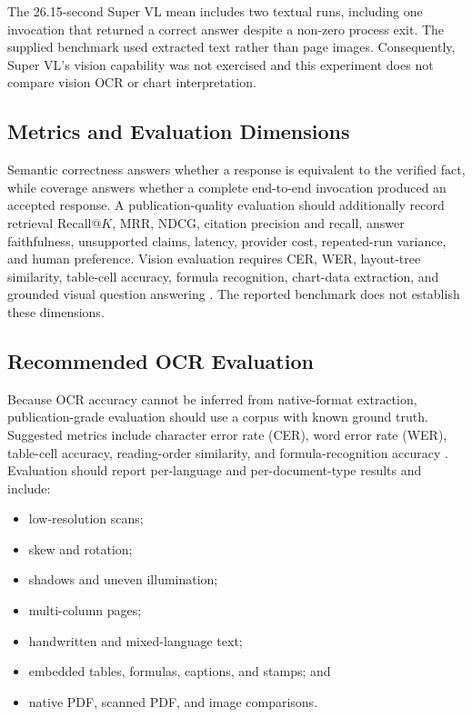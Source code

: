\documentclass[conference]{IEEEtran}
\begin{document}
The 26.15-second Super VL mean includes two textual runs, including one invocation that returned a correct answer despite a non-zero process exit. The supplied benchmark used extracted text rather than page images. Consequently, Super VL's vision capability was not exercised and this experiment does not compare vision OCR or chart interpretation.

\subsection{Metrics and Evaluation Dimensions}
Semantic correctness answers whether a response is equivalent to the verified fact, while coverage answers whether a complete end-to-end invocation produced an accepted response. A publication-quality evaluation should additionally record retrieval Recall@$K$, MRR, NDCG, citation precision and recall, answer faithfulness, unsupported claims, latency, provider cost, repeated-run variance, and human preference. Vision evaluation requires CER, WER, layout-tree similarity, table-cell accuracy, formula recognition, chart-data extraction, and grounded visual question answering \cite{omnidocbench2025,ocrBenchV2,ragEval2024}. The reported benchmark does not establish these dimensions.

\subsection{Recommended OCR Evaluation}
Because OCR accuracy cannot be inferred from native-format extraction, publication-grade evaluation should use a corpus with known ground truth. Suggested metrics include character error rate (CER), word error rate (WER), table-cell accuracy, reading-order similarity, and formula-recognition accuracy \cite{omnidocbench2025,ocrBenchV2}. Evaluation should report per-language and per-document-type results and include:
\begin{itemize}
 \item low-resolution scans;
 \item skew and rotation;
 \item shadows and uneven illumination;
 \item multi-column pages;
 \item handwritten and mixed-language text;
 \item embedded tables, formulas, captions, and stamps; and
 \item native PDF, scanned PDF, and image comparisons.
\end{itemize}
\end{document}
